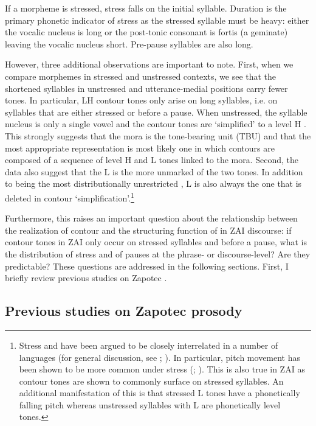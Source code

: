 If a morpheme is stressed, stress falls on the initial syllable. Duration is the primary phonetic indicator of stress as the stressed syllable must be heavy: either the vocalic nucleus is long or the post-tonic consonant is fortis (a geminate) leaving the vocalic nucleus short. Pre-pause syllables are also long.

However, three additional observations are important to note. First, when we compare morphemes in stressed and unstressed contexts, we see that the shortened syllables in unstressed and utterance-medial positions carry fewer tones. In particular, LH contour tones only arise on long syllables, i.e. on syllables that are either stressed or before a pause. When unstressed, the syllable nucleus is only a single vowel and the contour tones are `simplified' to a level H . This strongly suggests that the mora is the tone-bearing unit (TBU) and that the most appropriate representation is most likely one in which contours are composed of a sequence of level H and L tones linked to the mora. Second, the data also suggest that the L  is the more unmarked of the two tones. In addition to being the most distributionally unrestricted , L is also always the one that is deleted in contour  `simplification'.\footnote{Stress and  have been argued to be closely interrelated in a number of languages (for general discussion, see \citealt{yip2002}; \citealt{zhang2002}). In particular, pitch movement has been shown to be more common under stress (\citealt{zhang2002};  \citealt{zoll2003}). This is also true in ZAI as contour tones are shown to commonly surface on stressed syllables. An additional manifestation of this is that stressed L tones have a phonetically falling pitch whereas unstressed syllables with L  are phonetically level tones.} 

Furthermore, this raises an important question about the relationship between the realization of contour  and the structuring function of  in ZAI discourse: if contour tones in ZAI only occur on stressed syllables and before a pause, what is the distribution of stress and of pauses at the phrase- or discourse-level? Are they predictable? These questions are addressed in the following sections. First, I briefly review previous studies on Zapotec .


\subsection{Previous studies on Zapotec prosody}

